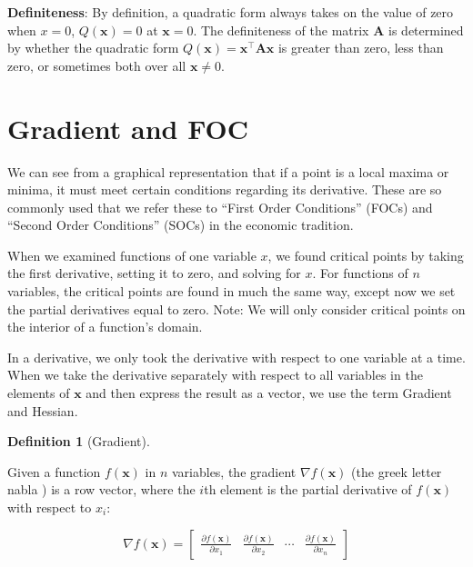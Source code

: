 \documentclass[
  letterpaper,
]{book}
\theoremstyle{definition}
\newtheorem{definition}{Definition}[chapter]
\theoremstyle{definition}
\theoremstyle{plain}
\theoremstyle{definition}
\theoremstyle{plain}
\theoremstyle{plain}
\theoremstyle{remark}
\begin{document}
\textbf{Definiteness}: By definition, a quadratic form always takes on
the value of zero when \(x = 0\), \(Q(\textbf{x})=0\) at
\(\textbf{x}=0\). The definiteness of the matrix \(\textbf{A}\) is
determined by whether the quadratic form
\(Q(\textbf{x})=\textbf{x}^\top\textbf{A}\textbf{x}\) is greater than
zero, less than zero, or sometimes both over all \(\mathbf{x}\ne 0\).

\hypertarget{gradient-and-foc}{%
\section{Gradient and FOC}\label{gradient-and-foc}}

We can see from a graphical representation that if a point is a local
maxima or minima, it must meet certain conditions regarding its
derivative. These are so commonly used that we refer these to ``First
Order Conditions'' (FOCs) and ``Second Order Conditions'' (SOCs) in the
economic tradition.

When we examined functions of one variable \(x\), we found critical
points by taking the first derivative, setting it to zero, and solving
for \(x\). For functions of \(n\) variables, the critical points are
found in much the same way, except now we set the partial derivatives
equal to zero. Note: We will only consider critical points on the
interior of a function's domain.

In a derivative, we only took the derivative with respect to one
variable at a time. When we take the derivative separately with respect
to all variables in the elements of \(\mathbf{x}\) and then express the
result as a vector, we use the term Gradient and Hessian.

\leavevmode{}%
\begin{definition}[Gradient]\label{def-}

Given a function \(f(\textbf{x})\) in \(n\) variables, the gradient
\(\nabla f(\mathbf{x})\) (the greek letter nabla ) is a row vector,
where the \(i\)th element is the partial derivative of \(f(\textbf{x})\)
with respect to \(x_i\):

\[\nabla f(\mathbf{x}) = \begin{bmatrix} \frac{\partial f(\mathbf{x})}{\partial x_1} &  \frac{\partial f(\mathbf{x})}{\partial x_2} & \cdots & \frac{\partial f(\mathbf{x})}{\partial x_n} \end{bmatrix}\]

\end{definition}
\end{document}
